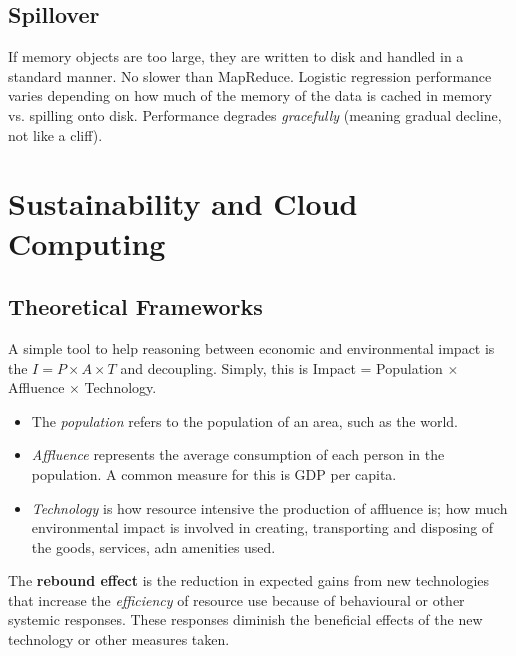 \documentclass[11pt,a4paper,titlepage,dvipsnames,cmyk]{scrartcl}
\begin{document}
\subsection{Spillover}
If memory objects are too large, they are written to disk and handled in a standard manner. No slower than MapReduce. Logistic regression performance varies depending on how much of the memory of the data is cached in memory vs. spilling onto disk. Performance degrades \textit{gracefully} (meaning gradual decline, not like a cliff).

\section{Sustainability and Cloud Computing}
\subsection{Theoretical Frameworks}
A simple tool to help reasoning between economic and environmental impact is the $I = P \times A \times T$ and decoupling. Simply, this is Impact = Population $\times$ Affluence $\times$ Technology.
\begin{itemize}
    \item The \textit{population} refers to the population of an area, such as the world.
    \item \textit{Affluence} represents the average consumption of each person in the population. A common measure for this is GDP per capita.
    \item \textit{Technology} is how resource intensive the production of affluence is; how much environmental impact is involved in creating, transporting and disposing of the goods, services, adn amenities used.
\end{itemize}

The \textbf{rebound effect} is the reduction in expected gains from new technologies that increase the \textit{efficiency} of resource use because of behavioural or other systemic responses. These responses diminish the beneficial effects of the new technology or other measures taken.
\end{document}
